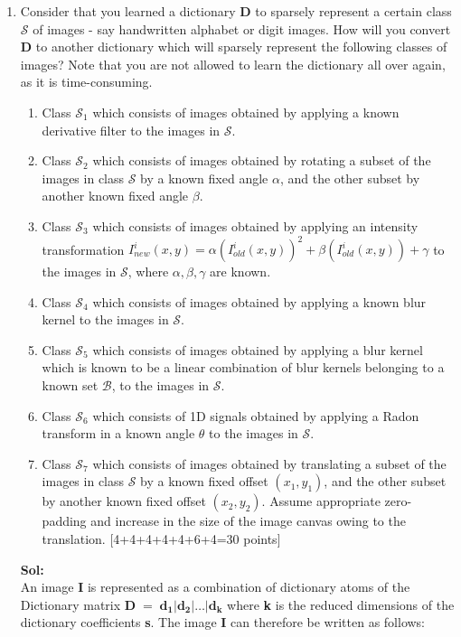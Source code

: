 \documentclass[11pt]{article}
\begin{document}
\begin{enumerate}
\clearpage
\item Consider that you learned a dictionary $\boldsymbol{D}$ to sparsely represent a certain class $\mathcal{S}$ of images - say handwritten alphabet or digit images. How will you convert $\boldsymbol{D}$ to another dictionary which will sparsely represent the following classes of images? Note that you are not allowed to learn the dictionary all over again, as it is time-consuming. 
\begin{enumerate}
\item Class $\mathcal{S}_1$ which consists of images obtained by applying a known derivative filter to the images in $\mathcal{S}$. 
\item Class $\mathcal{S}_2$ which consists of images obtained by rotating a subset of the images in class $\mathcal{S}$ by a known fixed angle $\alpha$, and the other subset by another known fixed angle $\beta$.
\item Class $\mathcal{S}_3$ which consists of images obtained by applying an intensity transformation $I^i_{new}(x,y) = \alpha (I^i_{old}(x,y))^2 + \beta (I^i_{old}(x,y)) + \gamma$ to the images in $\mathcal{S}$, where $\alpha,\beta,\gamma$ are known.  
\item Class $\mathcal{S}_4$ which consists of images obtained by applying a known blur kernel to the images in $\mathcal{S}$. 
\item Class $\mathcal{S}_5$ which consists of images obtained by applying a blur kernel which is known to be a linear combination of blur kernels belonging to a known set $\mathcal{B}$, to the images in $\mathcal{S}$. 
\item Class $\mathcal{S}_6$ which consists of 1D signals obtained by applying a Radon transform in a known angle $\theta$ to the images in $\mathcal{S}$. 
\item Class $\mathcal{S}_7$ which consists of images obtained by translating a subset of the images in class $\mathcal{S}$ by a known fixed offset $(x_1,y_1)$, and the other subset by another known fixed offset $(x_2,y_2)$. Assume appropriate zero-padding and increase in the size of the image canvas owing to the translation.
\textsf{[4+4+4+4+4+6+4=30 points]}
\end{enumerate}
\textbf{Sol:}\\
An image \textbf{I} is represented as a combination of dictionary atoms of the Dictionary matrix $\mathbf{D}\;=\;{\mathbf{d_1}|\mathbf{d_2}|\dots|\mathbf{d_k}}$ where \textbf{k} is the reduced dimensions of the dictionary coefficients \textbf{s}. The image \textbf{I} can therefore be written as follows:

\end{enumerate}
\end{document}
